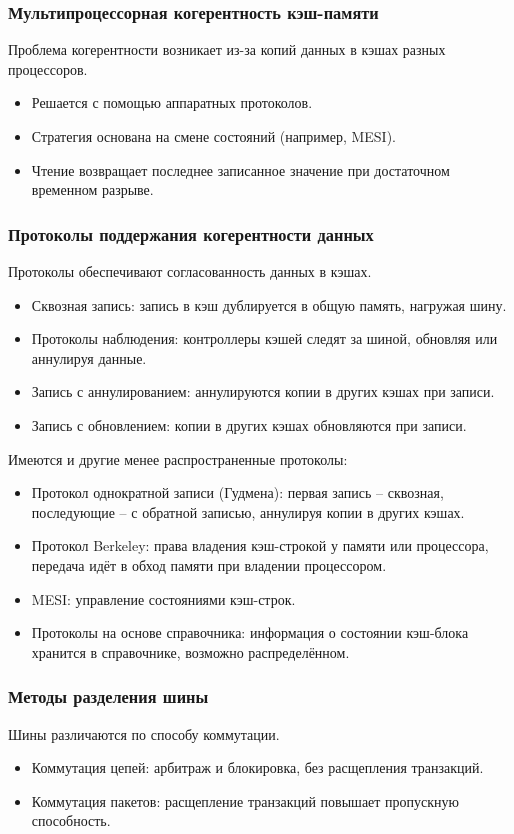 	\subsubsection{Мультипроцессорная когерентность кэш-памяти}
	Проблема когерентности возникает из-за копий данных в кэшах разных процессоров.
	\begin{itemize}
		\item Решается с помощью аппаратных протоколов.
		\item Стратегия основана на смене состояний (например, MESI).
		\item Чтение возвращает последнее записанное значение при достаточном временном разрыве.
	\end{itemize}
	\vspace{-1em}
	\subsubsection{Протоколы поддержания когерентности данных}
	Протоколы обеспечивают согласованность данных в кэшах.
	\begin{itemize}
		\item Сквозная запись: запись в кэш дублируется в общую память, нагружая шину.
		\item Протоколы наблюдения: контроллеры кэшей следят за шиной, обновляя или аннулируя данные.
		\item Запись с аннулированием: аннулируются копии в других кэшах при записи.
		\item Запись с обновлением: копии в других кэшах обновляются при записи.
	\end{itemize}
	
	Имеются и другие менее распространенные протоколы:
	\begin{itemize}
		\item Протокол однократной записи (Гудмена): первая запись -- сквозная, последующие -- с обратной записью, аннулируя копии в других кэшах.
		\item Протокол Berkeley: права владения кэш-строкой у памяти или процессора, передача идёт в обход памяти при владении процессором.
		\item MESI: управление состояниями кэш-строк.
		\item Протоколы на основе справочника: информация о состоянии кэш-блока хранится в справочнике, возможно распределённом.
	\end{itemize}
	\vspace{-1em}
	\subsubsection{Методы разделения шины}
	Шины различаются по способу коммутации.
	\begin{itemize}
		\item Коммутация цепей: арбитраж и блокировка, без расщепления транзакций.
		\item Коммутация пакетов: расщепление транзакций повышает пропускную способность.
	\end{itemize}
	
